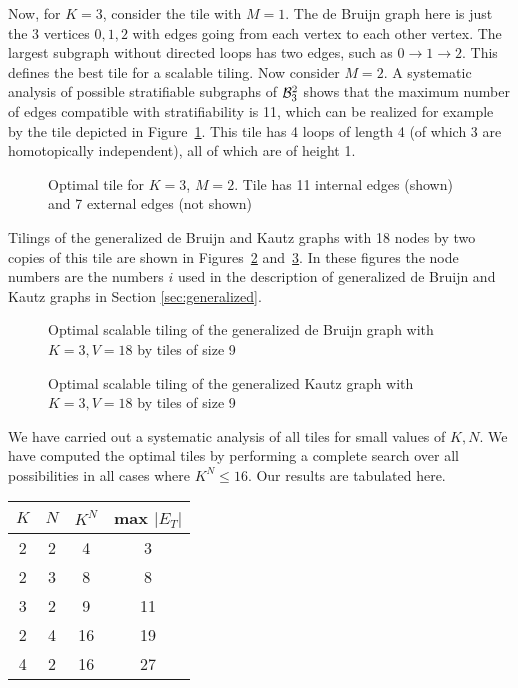 \documentclass[12pt]{article}
\begin{document}
Now, for $K = 3$, consider the tile with $M = 1$.  The de Bruijn graph
here is just the 3 vertices $0, 1, 2$ with edges going from each
vertex to each other vertex.  The largest subgraph without directed
loops has two edges, such as $0 \rightarrow 1 \rightarrow 2$.  This
defines the best tile for a scalable tiling.  Now consider $M = 2$.  A
systematic analysis of possible stratifiable subgraphs of ${\cal
  B}_3^2$ shows that the maximum number of edges compatible with
stratifiability is 11, which can be realized for example by the tile
depicted in Figure~\ref{f:tile-32}.  This tile has 4 loops of length 4
(of which 3 are homotopically independent), all of which are of height
1.
\begin{figure}
\begin{center}
\end{center}
\caption[x]{\footnotesize Optimal tile for $K = 3$, $M = 2$.  Tile has
11 internal edges  (shown) and 7 external edges (not shown)}
\label{f:tile-32}
\end{figure}
Tilings of the generalized de Bruijn and Kautz graphs with 18 nodes by
two copies of this tile are shown in Figures~\ref{f:d9-18}
and~\ref{f:k9-18}.  In  these figures the node numbers are the
numbers $i$ used in the description of generalized de Bruijn and Kautz
graphs in Section \ref{sec:generalized}.
\begin{figure}
\begin{center}
\end{center}
\caption[x]{\footnotesize Optimal scalable tiling of the generalized
  de Bruijn graph with $K = 3, V = 18$ by tiles of size 9}
\label{f:d9-18}
\end{figure}
\begin{figure}
\begin{center}
\end{center}
\caption[x]{\footnotesize Optimal scalable tiling of the generalized
Kautz graph with $K = 3, V = 18$ by tiles of size 9}
\label{f:k9-18}
\end{figure}


We have carried out a systematic analysis of all tiles for small
values of $K, N$.  We have computed the optimal tiles by performing a
complete search over all possibilities in all cases where $K^N \leq 16$.
Our results are
tabulated here.

\begin{center}
\begin{tabular}{| c | c | c | | c |}
\hline
 $K$ & $N$ & $K^N$  & max $| E_T |$\\
\hline
2 & 2 & 4 & 3\\
2 & 3 & 8 & 8\\
3 & 2 & 9 & 11\\
2 & 4 & 16 & 19\\
4 & 2 & 16 & 27\\
\hline
\end{tabular}
\end{center}
\end{document}
